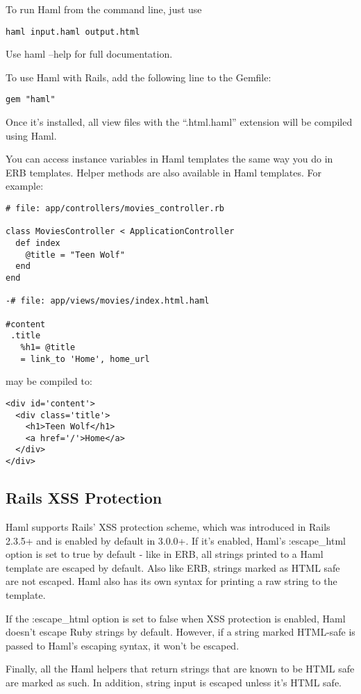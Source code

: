 \documentclass[9pt]{article}
\begin{document}
 To run Haml from the command line, just use
\begin{verbatim}
haml input.haml output.html
\end{verbatim}


 Use haml --help for full documentation.


 To use Haml with Rails, add the following line to the Gemfile:
\begin{verbatim}
gem "haml"
\end{verbatim}


 Once it’s installed, all view files with the ``.html.haml'' extension will be compiled using Haml.


 You can access instance variables in Haml templates the same way you do in ERB templates. Helper methods are also available in Haml templates. For example:
\begin{verbatim}
# file: app/controllers/movies_controller.rb

class MoviesController < ApplicationController
  def index
    @title = "Teen Wolf"
  end
end

-# file: app/views/movies/index.html.haml

#content
 .title
   %h1= @title
   = link_to 'Home', home_url
\end{verbatim}


 may be compiled to:
\begin{verbatim}
<div id='content'>
  <div class='title'>
    <h1>Teen Wolf</h1>
    <a href='/'>Home</a>
  </div>
</div>
\end{verbatim}
\subsection{Rails XSS Protection}


 Haml supports Rails’ XSS protection scheme, which was introduced in Rails 2.3.5+ and is enabled by default in 3.0.0+. If it’s enabled, Haml’s :escape\_html option is set to true by default - like in ERB, all strings printed to a Haml template are escaped by default. Also like ERB, strings marked as HTML safe are not escaped. Haml also has its own syntax for printing a raw string to the template.


 If the :escape\_html option is set to false when XSS protection is enabled, Haml doesn’t escape Ruby strings by default. However, if a string marked HTML-safe is passed to Haml’s escaping syntax, it won’t be escaped.


 Finally, all the Haml helpers that return strings that are known to be HTML safe are marked as such. In addition, string input is escaped unless it’s HTML safe.
\end{document}
